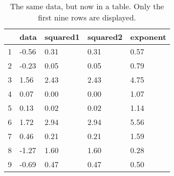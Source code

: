 \documentclass[10pt, a4paper, titlepage]{article}
\begin{document}
\begin{table}
\caption{The same data, but now in a table. Only the first nine rows are displayed.}
\centering
\begin{tabular}{lllll}
\hline
  & data  & squared1 & squared2 & exponent \\ \hline
1 & -0.56 & 0.31     & 0.31     & 0.57     \\
2 & -0.23 & 0.05     & 0.05     & 0.79     \\
3 & 1.56  & 2.43     & 2.43     & 4.75     \\
4 & 0.07  & 0.00     & 0.00     & 1.07     \\
5 & 0.13  & 0.02     & 0.02     & 1.14     \\
6 & 1.72  & 2.94     & 2.94     & 5.56     \\
7 & 0.46  & 0.21     & 0.21     & 1.59     \\
8 & -1.27 & 1.60     & 1.60     & 0.28     \\
9 & -0.69 & 0.47     & 0.47     & 0.50     \\ \hline
\end{tabular}
\end{table}
\end{document}
